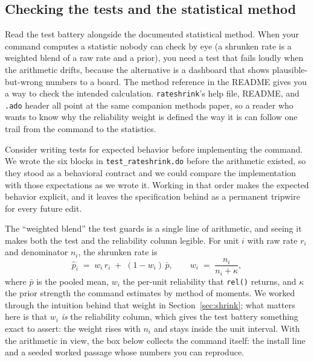 \documentclass[
    a4paper,
    fontsize=10pt,
    twoside=true,
    numbers=noenddot,
]{kaobook}
\begin{document}
\subsection{Checking the tests and the statistical method}\label{sec:ch15-trust-rows}
Read the test battery alongside the documented statistical method. When your command computes a statistic nobody can check by eye (a shrunken rate is a weighted blend of a raw rate and a prior), you need a test that fails loudly when the arithmetic drifts, because the alternative is a dashboard that shows plausible-but-wrong numbers to a board. The method reference in the README gives you a way to check the intended calculation. \texttt{rateshrink}'s help file, README, and \texttt{.ado} header all point at the same companion methods paper, so a reader who wants to know why the reliability weight is defined the way it is can follow one trail from the command to the statistics.

Consider writing tests for expected behavior before implementing the command. We wrote the six blocks in \texttt{test\_rateshrink.do} before the arithmetic existed, so they stood as a behavioral contract and we could compare the implementation with those expectations as we wrote it. Working in that order makes the expected behavior explicit, and it leaves the specification behind as a permanent tripwire for every future edit.

The \enquote{weighted blend} the test guards is a single line of arithmetic, and seeing it makes both the test and the reliability column legible. For unit $i$ with raw rate $r_i$ and denominator $n_i$, the shrunken rate is
\[
  \hat{p}_i \;=\; w_i\,r_i \;+\; (1-w_i)\,\bar{p},
  \qquad
  w_i \;=\; \frac{n_i}{n_i + \kappa},
\]
where $\bar p$ is the pooled mean, $w_i$ the per-unit reliability that \texttt{rel()} returns, and $\kappa$ the prior strength the command estimates by method of moments. We worked through the intuition behind that weight in Section~\ref{sec:shrink}; what matters here is that $w_i$ \emph{is} the reliability column, which gives the test battery something exact to assert: the weight rises with $n_i$ and stays inside the unit interval. With the arithmetic in view, the box below collects the command itself: the install line and a seeded worked passage whose numbers you can reproduce.
\end{document}
